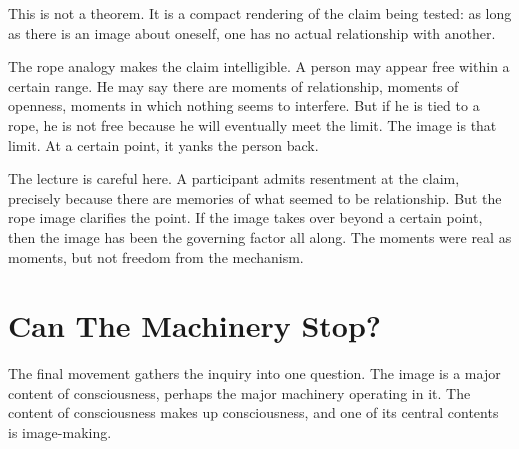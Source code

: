 This is not a theorem. It is a compact rendering of the claim being tested: as long as there is an image about oneself, one has no actual relationship with another.

The rope analogy makes the claim intelligible. A person may appear free within a certain range. He may say there are moments of relationship, moments of openness, moments in which nothing seems to interfere. But if he is tied to a rope, he is not free because he will eventually meet the limit. The image is that limit. At a certain point, it yanks the person back.

\begin{figure}
\centering
{}
\end{figure}

The lecture is careful here. A participant admits resentment at the claim, precisely because there are memories of what seemed to be relationship. But the rope image clarifies the point. If the image takes over beyond a certain point, then the image has been the governing factor all along. The moments were real as moments, but not freedom from the mechanism.

\section{Can The Machinery Stop?}

The final movement gathers the inquiry into one question. The image is a major content of consciousness, perhaps the major machinery operating in it. The content of consciousness makes up consciousness, and one of its central contents is image-making.

